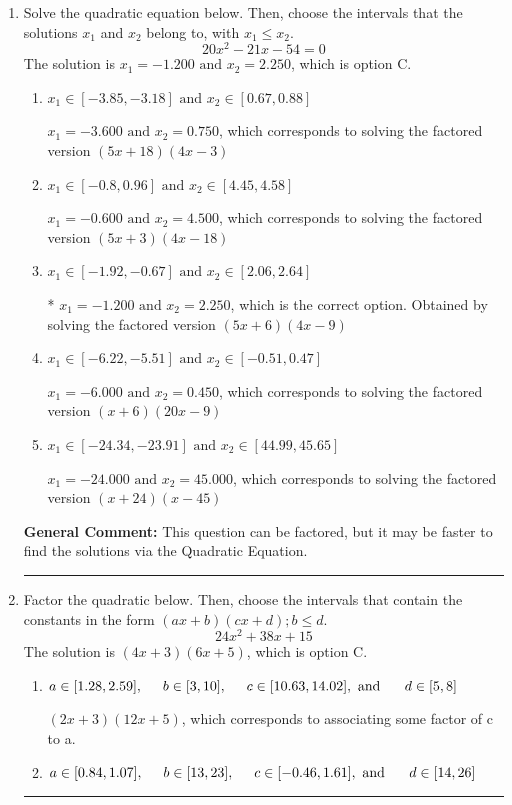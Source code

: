 \documentclass{extbook}[14pt]
\newcommand{\litem}[1]{\item #1

\rule{\textwidth}{0.4pt}}
\begin{document}
\begin{enumerate}\litem{
Solve the quadratic equation below. Then, choose the intervals that the solutions $x_1$ and $x_2$ belong to, with $x_1 \leq x_2$.
\[ 20x^{2} -21 x -54 = 0 \]The solution is \( x_1 = -1.200 \text{ and } x_2 = 2.250 \), which is option C.\begin{enumerate}[label=\Alph*.]
\item \( x_1 \in [-3.85, -3.18] \text{ and } x_2 \in [0.67, 0.88] \)

$x_1 = -3.600 \text{ and } x_2 = 0.750$, which corresponds to solving the factored version $(5x + 18)(4x -3)$
\item \( x_1 \in [-0.8, 0.96] \text{ and } x_2 \in [4.45, 4.58] \)

$x_1 = -0.600 \text{ and } x_2 = 4.500$, which corresponds to solving the factored version $(5x + 3)(4x -18)$
\item \( x_1 \in [-1.92, -0.67] \text{ and } x_2 \in [2.06, 2.64] \)

* $x_1 = -1.200 \text{ and } x_2 = 2.250$, which is the correct option. Obtained by solving the factored version $(5x + 6)(4x -9)$
\item \( x_1 \in [-6.22, -5.51] \text{ and } x_2 \in [-0.51, 0.47] \)

$x_1 = -6.000 \text{ and } x_2 = 0.450$, which corresponds to solving the factored version $(x + 6)(20x -9)$
\item \( x_1 \in [-24.34, -23.91] \text{ and } x_2 \in [44.99, 45.65] \)

$x_1 = -24.000 \text{ and } x_2 = 45.000$, which corresponds to solving the factored version $(x + 24)(x -45)$
\end{enumerate}

\textbf{General Comment:} This question can be factored, but it may be faster to find the solutions via the Quadratic Equation.
}
\litem{
Factor the quadratic below. Then, choose the intervals that contain the constants in the form $(ax+b)(cx+d); b \leq d.$
\[ 24x^{2} +38 x + 15 \]The solution is \( (4x + 3)(6x + 5) \), which is option C.\begin{enumerate}[label=\Alph*.]
\item \( a \in [1.28, 2.59], \hspace*{5mm} b \in [3, 10], \hspace*{5mm} c \in [10.63, 14.02], \text{ and } \hspace*{5mm} d \in [5, 8] \)

 $(2x + 3)(12x + 5)$, which corresponds to associating some factor of c to a.
\item \( a \in [0.84, 1.07], \hspace*{5mm} b \in [13, 23], \hspace*{5mm} c \in [-0.46, 1.61], \text{ and } \hspace*{5mm} d \in [14, 26] \)


\end{enumerate}}
\end{enumerate}
\end{document}
